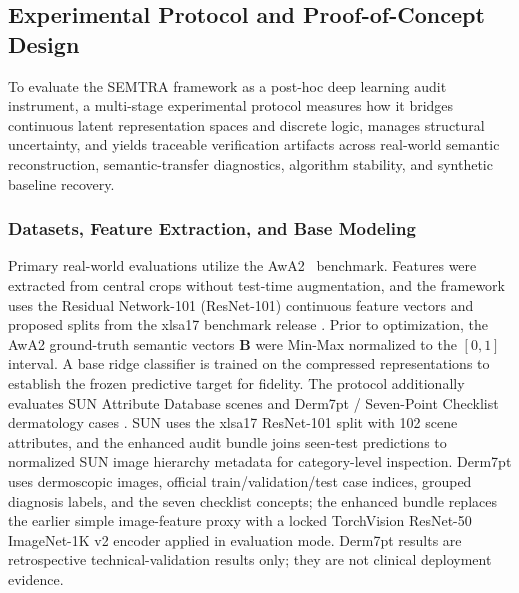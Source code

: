 \documentclass[make,article,submit,pdftex,moreauthors]{Definitions/mdpi}
\newcommand{\matB}{\mathbf{B}}
\begin{document}
\subsection{Experimental Protocol and Proof-of-Concept Design}
\label{subsec:protocol}

To evaluate the SEMTRA framework as a post-hoc deep learning audit instrument, a multi-stage experimental protocol measures how it bridges continuous latent representation spaces and discrete logic, manages structural uncertainty, and yields traceable verification artifacts across real-world semantic reconstruction, semantic-transfer diagnostics, algorithm stability, and synthetic baseline recovery.

\subsubsection{Datasets, Feature Extraction, and Base Modeling}
\label{subsubsec:datasets_base_modeling}

Primary real-world evaluations utilize the AwA2~\cite{AwA2Website} benchmark. Features were extracted from central crops without test-time augmentation, and the framework uses the Residual Network-101 (ResNet-101) continuous feature vectors and proposed splits from the xlsa17 benchmark release \cite{Xian2019AwA2}. Prior to optimization, the AwA2 ground-truth semantic vectors $\matB$ were Min-Max normalized to the $[0,1]$ interval. A base ridge classifier is trained on the compressed representations to establish the frozen predictive target for fidelity. The protocol additionally evaluates SUN Attribute Database scenes \cite{Patterson2014SUN,SUNAttributesWebsite} and Derm7pt / Seven-Point Checklist dermatology cases \cite{Kawahara2019Derm7pt,Derm7ptWebsite}. SUN uses the xlsa17 ResNet-101 split with 102 scene attributes, and the enhanced audit bundle joins seen-test predictions to normalized SUN image hierarchy metadata for category-level inspection. Derm7pt uses dermoscopic images, official train/validation/test case indices, grouped diagnosis labels, and the seven checklist concepts; the enhanced bundle replaces the earlier simple image-feature proxy with a locked TorchVision ResNet-50 ImageNet-1K v2 encoder applied in evaluation mode. Derm7pt results are retrospective technical-validation results only; they are not clinical deployment evidence.
\end{document}
